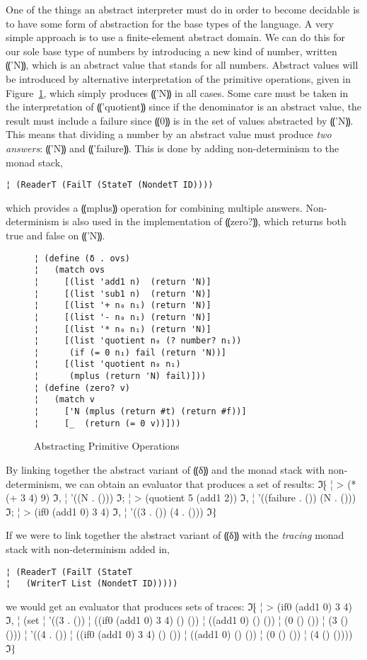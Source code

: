 One of the things an abstract interpreter must do in order to become
decidable is to have some form of abstraction for the base types of
the language.  A very simple approach is to use a finite-element
abstract domain.  We can do this for our sole base type of numbers by
introducing a new kind of number, written ⸨'N⸩, which is an
abstract value that stands for all numbers.  Abstract values will be
introduced by alternative interpretation of the primitive operations,
given in Figure~\ref{f:abs-delta}, which simply produces ⸨'N⸩ in
all cases.  Some care must be taken in the interpretation of
⸨'quotient⸩ since if the denominator is an abstract value, the
result must include a failure since ⸨0⸩ is in the set of values
abstracted by ⸨'N⸩.  This means that dividing a number by an
abstract value must produce \emph{two answers}: ⸨'N⸩ and
⸨'failure⸩.  This is done by adding non-determinism to the
monad stack,

\begin{lstlisting}
¦ (ReaderT (FailT (StateT (NondetT ID))))
\end{lstlisting}
which provides a ⸨mplus⸩ operation for combining multiple
answers.  Non-determinism is also used in the implementation of
⸨zero?⸩, which returns both true and false on ⸨'N⸩.

\begin{figure}
\begin{lstlisting}
¦ (define (δ . ovs)
¦   (match ovs
¦     [(list 'add1 n)  (return 'N)]
¦     [(list 'sub1 n)  (return 'N)]
¦     [(list '+ n₀ n₁) (return 'N)]
¦     [(list '- n₀ n₁) (return 'N)]
¦     [(list '* n₀ n₁) (return 'N)]
¦     [(list 'quotient n₀ (? number? n₁))
¦      (if (= 0 n₁) fail (return 'N))]
¦     [(list 'quotient n₀ n₁)
¦      (mplus (return 'N) fail)]))
¦ (define (zero? v)
¦   (match v
¦     ['N (mplus (return #t) (return #f))]
¦     [_  (return (= 0 v))]))
\end{lstlisting}
\caption{Abstracting Primitive Operations}
\label{f:abs-delta}
\end{figure}

By linking together the abstract variant of ⸨δ⸩ and the monad
stack with non-determinism, we can obtain an evaluator that produces a
set of results:
ℑ⁅
¦ > (* (+ 3 4) 9)
ℑ,
¦ '((N . ()))
ℑ;
¦ > (quotient 5 (add1 2))
ℑ,
¦ '((failure . ()) (N . ()))
ℑ;
¦ > (if0 (add1 0) 3 4)
ℑ,
¦ '((3 . ()) (4 . ()))
ℑ⁆

If we were to link together the abstract variant of ⸨δ⸩ with
the \emph{tracing} monad stack with non-determinism added in,
\begin{lstlisting}
¦ (ReaderT (FailT (StateT 
¦   (WriterT List (NondetT ID)))))
\end{lstlisting}
we would get an evaluator that produces sets of traces:
ℑ⁅
¦ > (if0 (add1 0) 3 4)
ℑ,
¦ (set
¦  '((3 . ())
¦    ((if0 (add1 0) 3 4) () ())
¦    ((add1 0) () ())
¦    (0 () ())
¦    (3 () ()))
¦  '((4 . ())
¦    ((if0 (add1 0) 3 4) () ())
¦    ((add1 0) () ())
¦    (0 () ())
¦    (4 () ())))
ℑ⁆


